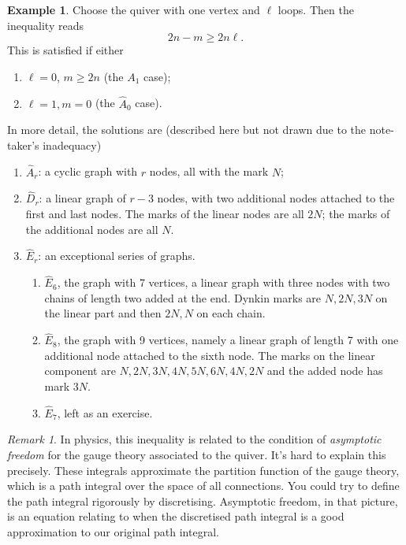 \documentclass[leqno, openany]{memoir}
\theoremstyle{definition}
\newtheorem{exm}[thm]{Example}
\theoremstyle{remark}
\newtheorem{rmk}[thm]{Remark}
\theoremstyle{plain}
\theoremstyle{definition}
\theoremstyle{remark}
\begin{document}
\begin{exm}
Choose the quiver with one vertex and $\ell$ loops. 
Then the inequality reads 
\[
2n -m \geq 2n \ell.
\]
This is satisfied if either 
\begin{enumerate}
\item $\ell = 0$, $m \geq 2n$ (the $A_1$ case);
\item $\ell = 1, m = 0$ (the $\widehat{A}_0$ case).
\end{enumerate}
\end{exm}

In more detail, the solutions are  (described here but not drawn due to the note-taker's inadequacy)
\begin{enumerate}
\item $\widehat{A}_r$: a cyclic graph with $r$ nodes, all with the mark $N$;
\item $\widehat{D}_r$: a linear graph of $r-3$ nodes, with two additional nodes attached to the first and last nodes. The marks of the linear nodes are all $2N$; the marks of the additional nodes are all $N$.
\item $\widehat{E}_r$: an exceptional series of graphs.
\begin{enumerate}
\item $\widehat{E}_6$, the graph with 7 vertices, a linear graph with three nodes with two chains of length two added at the end. Dynkin marks are $N,2N,3N$ on the linear part and then $2N,N$ on each chain.
\item $\widehat{E}_8$, the graph with 9 vertices, namely a linear graph of length 7 with one additional node attached to the sixth node. The marks on the linear component are $N,2N,3N,4N,5N,6N,4N,2N$ and the added node has mark $3N$.
\item $\widehat{E}_7$, left as an exercise. 
\end{enumerate}
\end{enumerate}

\begin{rmk}
In physics, this inequality is related to the condition of \emph{asymptotic freedom}
for the gauge theory associated to the quiver. It's hard to explain this precisely.
These integrals approximate the partition function of the gauge theory, which is a path integral over the space of all connections.
You could try to define the path integral rigorously by discretising. Asymptotic freedom, in that picture, is an equation relating to when 
the discretised path integral is a good approximation to our original path integral.
\end{rmk}
\end{document}
